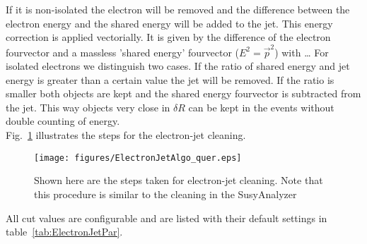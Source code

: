 \documentclass{cmspaper}
\begin{document}
 If it is non-isolated the electron will be removed and the difference between the electron energy and the
shared energy will be added to the jet. This energy correction is applied
vectorially. It is given by the difference of the electron fourvector and a
massless 'shared energy' fourvector ($E^2=\vec{p}^2$) {\color{red}with \ldots}
For isolated electrons we distinguish two cases. If the ratio of shared energy
and jet energy is greater than a certain value the jet will be removed. If the
ratio is smaller both objects are kept and the shared energy fourvector is subtracted from
the jet. This way objects very close in $\delta R$ can be kept in the events
without double counting of energy.\\

Fig.~\ref{fig:EJCleaning} illustrates the steps for the electron-jet cleaning.\\
\begin{figure}[hbtp]
  \begin{center}
    \texttt{[image: figures/ElectronJetAlgo\_quer.eps]}
    \caption{Shown here are the steps taken for electron-jet cleaning. Note that this procedure is similar to the cleaning in the SusyAnalyzer~\cite{SusyAnalyzer}}
    \label{fig:EJCleaning}
  \end{center}
\end{figure}



All cut values are configurable and are listed with their default settings in
table~\ref{tab:ElectronJetPar}.
\end{document}
